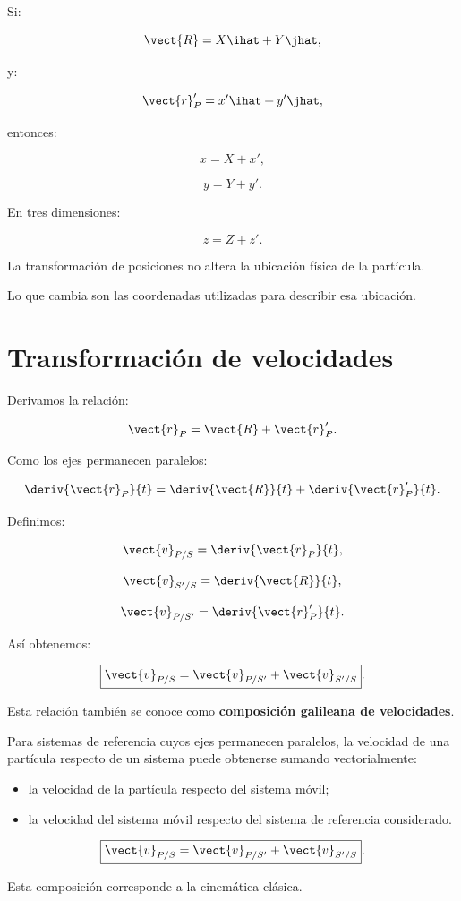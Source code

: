 Si:

\[
\vect{R}=X\ihat+Y\jhat,
\]

y:

\[
\vect{r}'_P=x'\ihat+y'\jhat,
\]

entonces:

\[
\boxed{
x=X+x'
},
\]

\[
\boxed{
y=Y+y'
}.
\]

En tres dimensiones:

\[
\boxed{
z=Z+z'
}.
\]

\begin{interpretacion}

La transformación de posiciones no altera la ubicación
física de la partícula.

Lo que cambia son las coordenadas utilizadas para
describir esa ubicación.

\end{interpretacion}


\section{Transformación de velocidades}

Derivamos la relación:

\[
\vect{r}_P=\vect{R}+\vect{r}'_P.
\]

Como los ejes permanecen paralelos:

\[
\deriv{\vect{r}_P}{t}
=
\deriv{\vect{R}}{t}
+
\deriv{\vect{r}'_P}{t}.
\]

Definimos:

\[
\vect{v}_{P/S}
=
\deriv{\vect{r}_P}{t},
\]

\[
\vect{v}_{S'/S}
=
\deriv{\vect{R}}{t},
\]

\[
\vect{v}_{P/S'}
=
\deriv{\vect{r}'_P}{t}.
\]

Así obtenemos:

\[
\boxed{
\vect{v}_{P/S}
=
\vect{v}_{P/S'}
+
\vect{v}_{S'/S}
}.
\]

Esta relación también se conoce como
\textbf{composición galileana de velocidades}.

\begin{principio}

Para sistemas de referencia cuyos ejes permanecen paralelos,
la velocidad de una partícula respecto de un sistema puede
obtenerse sumando vectorialmente:

\begin{itemize}
    \item la velocidad de la partícula respecto del sistema móvil;
    \item la velocidad del sistema móvil respecto del sistema
    de referencia considerado.
\end{itemize}

\[
\boxed{
\vect{v}_{P/S}
=
\vect{v}_{P/S'}
+
\vect{v}_{S'/S}
}.
\]

Esta composición corresponde a la cinemática clásica.

\end{principio}


